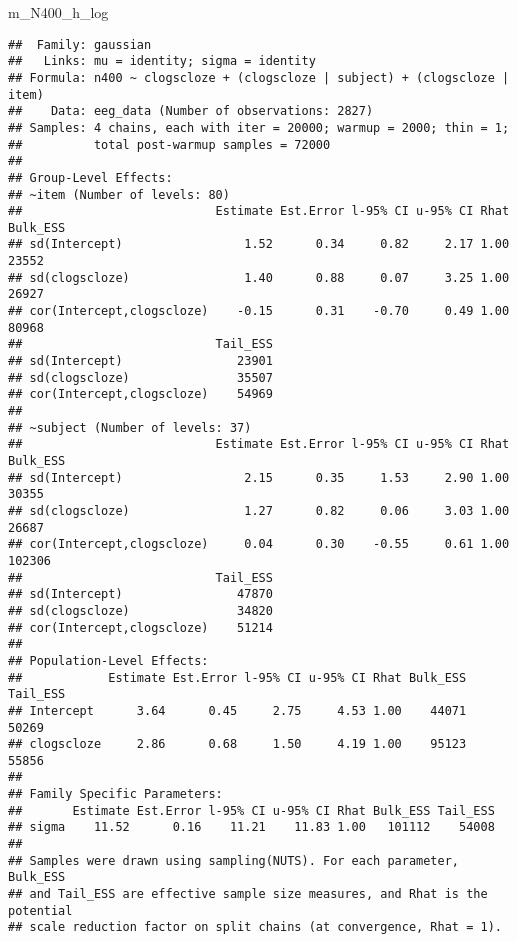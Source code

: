 \documentclass[12pt,ignorenonframetext,aspectratio=169]{beamer}
\newenvironment{Shaded}{\begin{snugshade}}{\end{snugshade}}
\newcommand{\NormalTok}[1]{#1}
\begin{document}
\begin{frame}[fragile]

\tiny

\begin{Shaded}
\begin{Highlighting}[]
\NormalTok{m_N400_h_log}
\end{Highlighting}
\end{Shaded}

\begin{verbatim}
##  Family: gaussian 
##   Links: mu = identity; sigma = identity 
## Formula: n400 ~ clogscloze + (clogscloze | subject) + (clogscloze | item) 
##    Data: eeg_data (Number of observations: 2827) 
## Samples: 4 chains, each with iter = 20000; warmup = 2000; thin = 1;
##          total post-warmup samples = 72000
## 
## Group-Level Effects: 
## ~item (Number of levels: 80) 
##                           Estimate Est.Error l-95% CI u-95% CI Rhat Bulk_ESS
## sd(Intercept)                 1.52      0.34     0.82     2.17 1.00    23552
## sd(clogscloze)                1.40      0.88     0.07     3.25 1.00    26927
## cor(Intercept,clogscloze)    -0.15      0.31    -0.70     0.49 1.00    80968
##                           Tail_ESS
## sd(Intercept)                23901
## sd(clogscloze)               35507
## cor(Intercept,clogscloze)    54969
## 
## ~subject (Number of levels: 37) 
##                           Estimate Est.Error l-95% CI u-95% CI Rhat Bulk_ESS
## sd(Intercept)                 2.15      0.35     1.53     2.90 1.00    30355
## sd(clogscloze)                1.27      0.82     0.06     3.03 1.00    26687
## cor(Intercept,clogscloze)     0.04      0.30    -0.55     0.61 1.00   102306
##                           Tail_ESS
## sd(Intercept)                47870
## sd(clogscloze)               34820
## cor(Intercept,clogscloze)    51214
## 
## Population-Level Effects: 
##            Estimate Est.Error l-95% CI u-95% CI Rhat Bulk_ESS Tail_ESS
## Intercept      3.64      0.45     2.75     4.53 1.00    44071    50269
## clogscloze     2.86      0.68     1.50     4.19 1.00    95123    55856
## 
## Family Specific Parameters: 
##       Estimate Est.Error l-95% CI u-95% CI Rhat Bulk_ESS Tail_ESS
## sigma    11.52      0.16    11.21    11.83 1.00   101112    54008
## 
## Samples were drawn using sampling(NUTS). For each parameter, Bulk_ESS
## and Tail_ESS are effective sample size measures, and Rhat is the potential
## scale reduction factor on split chains (at convergence, Rhat = 1).
\end{verbatim}

\end{frame}
\end{document}
